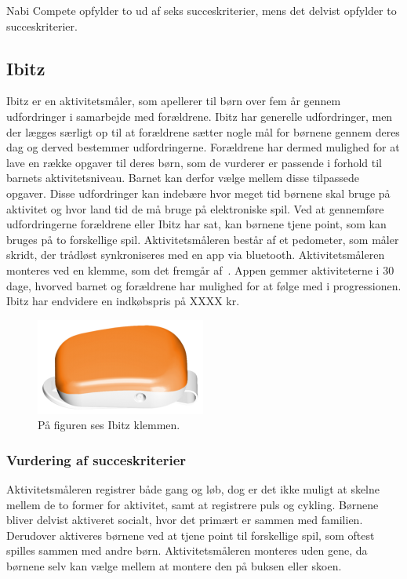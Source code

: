 Nabi Compete opfylder to ud af seks succeskriterier, mens det delvist opfylder to succeskriterier.

\subsection{Ibitz}
Ibitz er en aktivitetsmåler, som apellerer til børn over fem år gennem udfordringer i samarbejde med forældrene. Ibitz har generelle udfordringer, men der lægges særligt op til at forældrene sætter nogle mål for børnene gennem deres dag og derved bestemmer udfordringerne. Forældrene har dermed mulighed for at lave en række opgaver til deres børn, som de vurderer er passende i forhold til barnets aktivitetsniveau. Barnet kan derfor vælge mellem disse tilpassede opgaver. \newline
Disse udfordringer kan indebære hvor meget tid børnene skal bruge på aktivitet og hvor land tid de må bruge på elektroniske spil. Ved at gennemføre udfordringerne forældrene eller Ibitz har sat, kan børnene tjene point, som kan bruges på to forskellige spil. \newline
Aktivitetsmåleren består af et pedometer, som måler skridt, der trådløst synkroniseres med en app via bluetooth. Aktivitetsmåleren monteres ved en klemme, som det fremgår af~. Appen gemmer aktiviteterne i 30 dage, hvorved barnet og forældrene har mulighed for at følge med i progressionen. \citep{Ibitz_features2016}
Ibitz har endvidere en indkøbspris på XXXX kr. 
\begin{figure}[H]
	\centering
	\includegraphics[scale=0.9]{figures/aProblemanalyse/ibitz.png}
	\caption{På figuren ses Ibitz klemmen.\citep{Ibitz_features2016}}
	\label{fig:ibitz}
\end{figure}

\subsubsection{Vurdering af succeskriterier}
Aktivitetsmåleren registrer både gang og løb, dog er det ikke muligt at skelne mellem de to former for aktivitet, samt at registrere puls og cykling. Børnene bliver delvist aktiveret socialt, hvor det primært er sammen med familien. Derudover aktiveres børnene ved at tjene point til forskellige spil, som oftest spilles sammen med andre børn. Aktivitetsmåleren monteres uden gene, da børnene selv kan vælge mellem at montere den på buksen eller skoen.  

